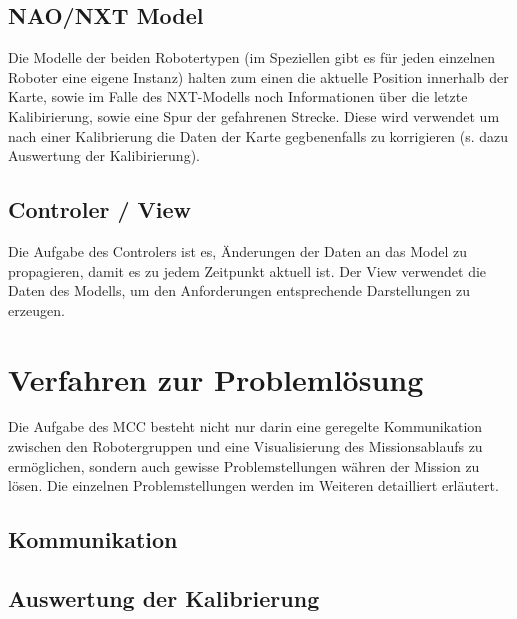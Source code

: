 \begin{enumerate}
\subsection{NAO/NXT Model}
Die Modelle der beiden Robotertypen (im Speziellen gibt es für jeden einzelnen Roboter eine eigene Instanz) halten zum einen die aktuelle Position innerhalb der Karte, sowie im Falle des NXT-Modells noch Informationen über die letzte Kalibirierung, sowie eine Spur der gefahrenen Strecke. Diese wird verwendet um nach einer Kalibrierung die Daten der Karte gegbenenfalls zu korrigieren (s. dazu Auswertung der Kalibirierung).

\subsection{Controler / View}
Die Aufgabe des Controlers ist es, Änderungen der Daten an das Model zu propagieren, damit es zu jedem Zeitpunkt aktuell ist. Der View verwendet die Daten des Modells, um den Anforderungen entsprechende Darstellungen zu erzeugen.


\section{Verfahren zur Problemlösung}
Die Aufgabe des MCC besteht nicht nur darin eine geregelte Kommunikation zwischen den Robotergruppen und eine Visualisierung des Missionsablaufs zu ermöglichen, sondern auch gewisse Problemstellungen währen der Mission zu lösen. Die einzelnen Problemstellungen werden im Weiteren detailliert erläutert.

\subsection{Kommunikation}

\subsection{Auswertung der Kalibrierung}


\end{enumerate}
